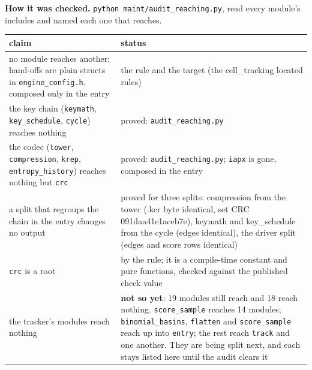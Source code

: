\textbf{How it was checked.} \texttt{python maint/\allowbreak{}audit\_\allowbreak{}reaching.\allowbreak{}py}, read every module's includes and named each one that reaches.

{\small
\setlength{\tabcolsep}{6pt}
\begin{longtable}{>{\RaggedRight\arraybackslash}p{}>{\RaggedRight\arraybackslash}p{}}
\toprule
claim & status \\
\midrule
\endhead
no module reaches another; hand-offs are plain structs in \texttt{engine\_\allowbreak{}config.\allowbreak{}h}, composed only in the entry & the rule and the target (the cell\_\allowbreak{}tracking located rules) \\
the key chain (\texttt{keymath}, \texttt{key\_\allowbreak{}schedule}, \texttt{cycle}) reaches nothing & proved: \texttt{audit\_\allowbreak{}reaching.\allowbreak{}py} \\
the codec (\texttt{tower}, \texttt{compression}, \texttt{krep}, \texttt{entropy\_\allowbreak{}history}) reaches nothing but \texttt{crc} & proved: \texttt{audit\_\allowbreak{}reaching.\allowbreak{}py}; \texttt{iapx} is gone, composed in the entry \\
a split that regroups the chain in the entry changes no output & proved for three splits: compression from the tower (.kcr byte identical, set CRC 091daa41e1aceb7e), keymath and key\_\allowbreak{}schedule from the cycle (edges identical), the driver split (edges and score rows identical) \\
\texttt{crc} is a root & by the rule; it is a compile-time constant and pure functions, checked against the published check value \\
the tracker's modules reach nothing & \textbf{not so yet}: 19 modules still reach and 18 reach nothing. \texttt{score\_\allowbreak{}sample} reaches 14 modules; \texttt{binomial\_\allowbreak{}basins}, \texttt{flatten} and \texttt{score\_\allowbreak{}sample} reach up into \texttt{entry}; the rest reach \texttt{track} and one another. They are being split next, and each stays listed here until the audit clears it \\
\bottomrule
\end{longtable}
}
